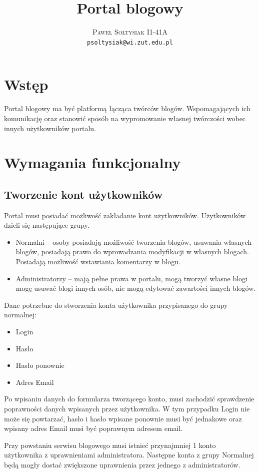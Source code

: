 \documentclass{article}
\title{Portal blogowy}
\author{\textsc{Paweł Sołtysiak I1-41A} \\ \texttt{psoltysiak@wi.zut.edu.pl}}
\begin{document}
\maketitle
\section{Wstęp}
Portal blogowy ma być platformą łącząca twórców blogów. Wspomagających ich komunikację oraz stanowić sposób na wypromowanie własnej twórczości wobec innych użytkowników portalu.



\section{Wymagania funkcjonalny}
\subsection{Tworzenie kont użytkowników}
Portal musi posiadać możliwość zakładanie kont użytkowników. Użytkowników dzieli się następujące grupy.
\begin{itemize}
\item Normalni -- osoby posiadają możliwość tworzenia blogów, usuwania własnych blogów, posiadają prawo do wprowadzania modyfikacji w własnych blogach. Posiadają możliwość wstawiania komentarzy w blogu.
\item Administratorzy -- mają pełne prawa w portalu, mogą tworzyć własne blogi mogę usuwać blogi innych osób, nie mogą edytować zawartości innych blogów.
\end{itemize}

Dane potrzebne do stworzenia konta użytkownika przypisanego do grupy normalnej:
\begin{itemize}
\item Login
\item Hasło
\item Hasło ponownie
\item Adres Email
\end{itemize}

Po wpisaniu danych do formularza tworzącego konto, musi zachodzić sprawdzenie poprawności danych wpisanych przez użytkownika. W tym przypadku Login nie może się powtarzać, hasło i hasło wpisane ponownie musi być jednakowe oraz wpisany adres Email musi być poprawnym adresem email.

Przy powstaniu serwisu blogowego musi istnieć przynajmniej 1 konto użytkownika z uprawnieniami administratora. Następne konta z grupy Normalnej będą mogły dostać zwiększone uprawnienia przez jednego z administratorów.
\end{document}
